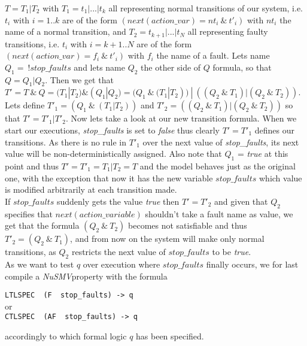 \documentclass[12pt]{llncs2e/llncs}
\newcommand{\nusmv}{\mbox{\textit{NuSMV}}}
\begin{document}
$T = T_1 | T_2$ with $T_1 = t_1 | ... | t_k$ all representing normal transitions of our system, i.e. $t_i$ with $i=1..k$ are of the form $(next(action\_var) = nt_i~\&~t'_i)$ with $nt_i$ the name of a normal transition, and $T_2 = t_{k+1} | ... | t_N$ all representing faulty transitions, i.e. $t_i$ with $i=k+1..N$ are of the form $(next(action\_var) = f_i~\&~t'_i)$ with $f_i$ the name of a fault. Lets name $Q_1 =~!stop\_faults$ and lets name $Q_2$ the other side of $Q$ formula, so that $Q = Q_1 | Q_2$.
Then we get that $T' = T ~\&~ Q = (T_1|T_2) \& (Q_1|Q_2) = (Q_1~\&~(T_1|T_2)) ~|~ ((Q_2~\&~T_1) | (Q_2~\&~T_2))$. Lets define $T'_1 = (Q_1~\&~(T_1|T_2))$ and $T'_2 = ((Q_2~\&~T_1) | (Q_2~\&~T_2))$ so that $T' = T'_1 | T'_2$. Now lets take a look at our new transition formula. When we start our executions, \textit{stop\_faults} is set to \textit{false} thus clearly $T' = T'_1$ defines our transitions. As there is no rule in $T'_1$ over the next value of \textit{stop\_faults}, its next value will be non-deterministically assigned. Also note that $Q_1$ = \textit{true} at this point and thus $T' = T'_1 = T_1 | T_2 = T$ and the model behaves just as the original one, with the exception that now it has the new variable $stop\_faults$ which value is modified arbitrarily at each transition made.\\
If $stop\_faults$ suddenly gets the value \textit{true} then $T' = T'_2$ and given that $Q_2$ specifies that $next(action\_variable)$ shouldn't take a fault name as value, we get that the formula $(Q_2~\&~ T_2)$ becomes not satisfiable and thus $T'_2 = (Q_2 ~\&~ T_1)$, and from now on the system will make only normal transitions, as $Q_2$ restricts the next value of $stop\_faults$ to be \textit{true}.\\
As we want to test $q$ over execution where $stop\_faults$ finally occurs, we for last compile a \nusmv property with the formula
\begin{center}
\texttt{LTLSPEC~ (F ~stop\_faults) -> q}\\
or\\
\texttt{CTLSPEC ~(AF~ stop\_faults) -> q}
\end{center} 
accordingly to which formal logic $q$ has been specified.
\end{document}
